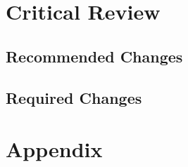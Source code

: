 \documentclass[a4paper,oneside]{bth}
\begin{document}
\pagestyle{plain}




\cleardoublepage
\pagestyle{headings}


\section*{Critical Review}
\subsection*{Recommended Changes}





\subsection*{Required Changes}


\section*{Appendix}



\end{document}
